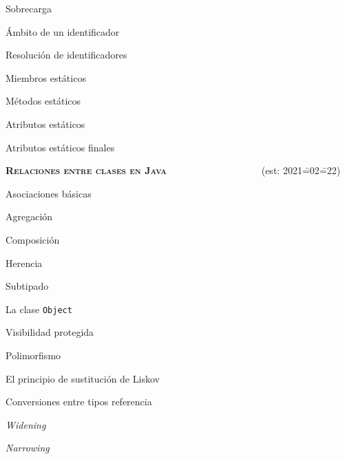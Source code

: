 \begin{longenum}
\begin{longenum}
\begin{longenum}
\begin{longenum}
                \item Sobrecarga
                \item Ámbito de un identificador
                \item Resolución de identificadores
            \end{longenum}
        \end{longenum}
        \item Miembros estáticos
        \begin{longenum}
            \item Métodos estáticos
            \item Atributos estáticos
            \item Atributos estáticos finales
        \end{longenum}
    \end{longenum}
    \item \textbf{\textsc{Relaciones entre clases en Java}} \ \ \ \ \ \ \ \ \ \ \ \ \ \ \ \ \ \ \ (est: 2021\==02\==22)
    \begin{longenum}
        \item Asociaciones básicas
        \begin{longenum}
            \item Agregación
            \item Composición
        \end{longenum}
        \item Herencia
        \begin{longenum}
            \item Subtipado
            \item La clase \texttt{Object}
            \item Visibilidad protegida
        \end{longenum}
        \item Polimorfismo
        \begin{longenum}
            \item El principio de sustitución de Liskov
            \item Conversiones entre tipos referencia
            \begin{longenum}
                \item \textit{Widening}
                \item \textit{Narrowing}
            \end{longenum}

\end{longenum}
\end{longenum}
\end{longenum}
